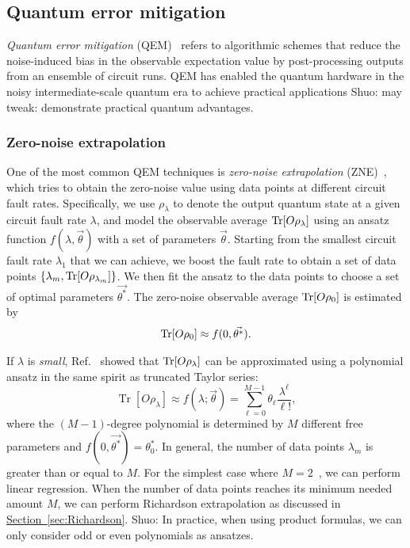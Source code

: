 \documentclass[11pt]{article}
\renewcommand{\sec}[1]{\hyperref[sec:#1]{Section~\ref*{sec:#1}}}
\newcommand{\sz}[1]{{\color{blue} Shuo: #1}}
\begin{document}
\subsection{Quantum error mitigation}
\textit{Quantum error mitigation} (QEM)~\cite{cai2023quantum} refers to algorithmic schemes that reduce the noise-induced bias in the observable expectation value by post-processing outputs from an ensemble of circuit runs. QEM has enabled the quantum hardware in the noisy intermediate-scale quantum era to achieve practical applications \sz{may tweak: demonstrate practical quantum advantages}.

\subsubsection{Zero-noise extrapolation}
One of the most common QEM techniques is \textit{zero-noise extrapolation} (ZNE)~\cite{li2017efficient, PhysRevLett.119.180509}, which tries to obtain the zero-noise value using data points at different circuit fault rates. Specifically, we use $\rho_\lambda$ to denote the output quantum state at a given circuit fault rate $\lambda$, and model the observable average $\Tr[O\rho_\lambda]$ using an ansatz function $f(\lambda,\vec{\theta})$ with a set of parameters $\vec{\theta}$. Starting from the smallest circuit fault rate $\lambda_1$ that we can achieve, we boost the fault rate to obtain a set of data points $\{\lambda_m,\Tr[O\rho_{\lambda_m}]\}$. We then fit the ansatz to the data points to choose a set of optimal parameters $\vec{\theta^*}$. The zero-noise observable average $\Tr[O\rho_0]$ is estimated by
\begin{align*}
    \Tr[O\rho_0]\approx f(0,\vec{\theta^*}).
\end{align*}

If $\lambda$ is \textit{small}, Ref.~\cite{PhysRevLett.119.180509} showed that $\Tr[O\rho_\lambda]$ can be approximated using a polynomial ansatz in the same spirit as truncated Taylor series:
\begin{equation*}
\operatorname{Tr}\left[O \rho_\lambda\right] \approx f(\lambda ; \vec{\theta})=\sum_{\ell=0}^{M-1} \theta_{\ell} \frac{\lambda^{\ell}}{\ell!},
\end{equation*}
where the $(M-1)$-degree polynomial is determined by $M$ different free parameters and $f(0,\vec{\theta^*})={\theta_0^*}$. In general, the number of data points $\lambda_m$ is greater than or equal to $M$. For the simplest case where $M=2$~\cite{li2017efficient}, we can perform linear regression. When the number of data points reaches its minimum needed amount $M$, we can perform Richardson extrapolation as discussed in \sec{Richardson}. \sz{In practice, when using product formulas, we can only consider odd or even polynomials as ansatzes.}
\end{document}
